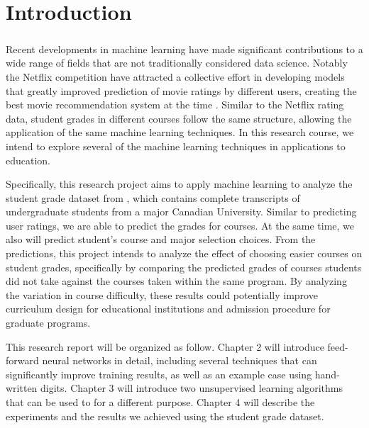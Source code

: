 
\chapter{Introduction} \label{sc:intro}

\paragraph{}
Recent developments in machine learning have made significant 
contributions to a wide range of fields that are not 
traditionally considered data science.
Notably the Netflix competition have attracted a collective
effort in developing models that greatly improved prediction
of movie ratings by different users,
creating the best movie recommendation system at the time \cite{FeHeKh12}.
Similar to the Netflix rating data,
student grades in different courses follow the same structure,
allowing the application of the same machine learning techniques.
In this research course, we intend to explore several of the 
machine learning techniques in applications to education.

Specifically, this research project aims to apply machine learning 
to analyze the student grade dataset from \cite{BaRoYo14},
which contains complete transcripts of undergraduate students
from a major Canadian University.
Similar to predicting user ratings,
we are able to predict the grades for courses.
At the same time,
we also will predict student's course and major 
selection choices.
From the predictions, this project intends to analyze
the effect of choosing easier courses on student grades,
specifically by comparing the predicted grades of courses
students did not take against the courses taken 
within the same program.
By analyzing the variation in course difficulty,
these results could potentially improve curriculum design 
for educational institutions and admission procedure for
graduate programs.

This research report will be organized as follow.
Chapter 2 will introduce feed-forward neural networks
in detail, including several techniques that 
can significantly improve training results,
as well as an example case using hand-written digits.
Chapter 3 will introduce two unsupervised learning 
algorithms that can be used to for a different purpose.
Chapter 4 will describe the experiments and 
the results we achieved using the student grade dataset.


